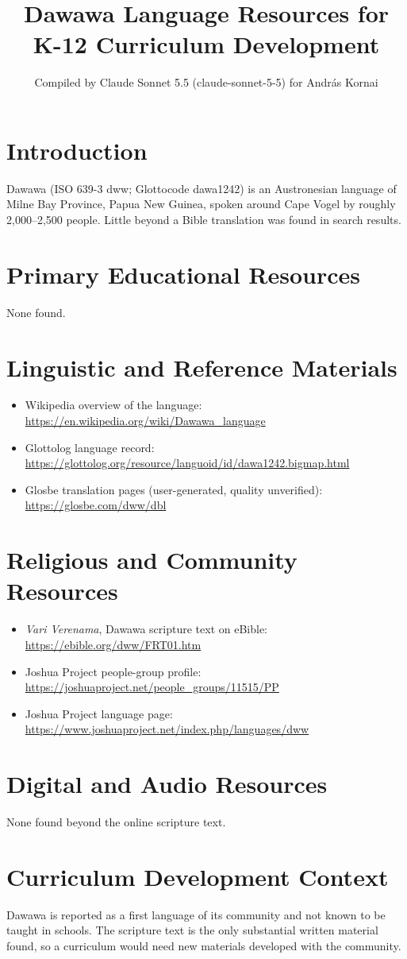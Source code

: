 \documentclass[12pt]{article}
\title{Dawawa Language Resources for K-12 Curriculum Development}
\author{Compiled by Claude Sonnet 5.5 (claude-sonnet-5-5) for Andr\'as Kornai}
\date{}
\begin{document}
\maketitle

\section{Introduction}
Dawawa (ISO 639-3 dww; Glottocode dawa1242) is an Austronesian language of Milne Bay Province, Papua New Guinea, spoken around Cape Vogel by roughly 2,000--2,500 people. Little beyond a Bible translation was found in search results.

\section{Primary Educational Resources}
None found.

\section{Linguistic and Reference Materials}
\begin{itemize}
\item Wikipedia overview of the language: \url{https://en.wikipedia.org/wiki/Dawawa_language}
\item Glottolog language record: \url{https://glottolog.org/resource/languoid/id/dawa1242.bigmap.html}
\item Glosbe translation pages (user-generated, quality unverified): \url{https://glosbe.com/dww/dbl}
\end{itemize}

\section{Religious and Community Resources}
\begin{itemize}
\item \emph{Vari Verenama}, Dawawa scripture text on eBible: \url{https://ebible.org/dww/FRT01.htm}
\item Joshua Project people-group profile: \url{https://joshuaproject.net/people_groups/11515/PP}
\item Joshua Project language page: \url{https://www.joshuaproject.net/index.php/languages/dww}
\end{itemize}

\section{Digital and Audio Resources}
None found beyond the online scripture text.

\section{Curriculum Development Context}
Dawawa is reported as a first language of its community and not known to be taught in schools. The scripture text is the only substantial written material found, so a curriculum would need new materials developed with the community.
\end{document}
